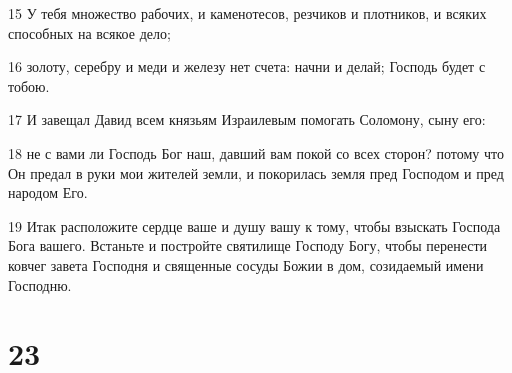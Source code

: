 \par 15 У тебя множество рабочих, и каменотесов, резчиков и плотников, и всяких способных на всякое дело;
\par 16 золоту, серебру и меди и железу нет счета: начни и делай; Господь будет с тобою.
\par 17 И завещал Давид всем князьям Израилевым помогать Соломону, сыну его:
\par 18 не с вами ли Господь Бог наш, давший вам покой со всех сторон? потому что Он предал в руки мои жителей земли, и покорилась земля пред Господом и пред народом Его.
\par 19 Итак расположите сердце ваше и душу вашу к тому, чтобы взыскать Господа Бога вашего. Встаньте и постройте святилище Господу Богу, чтобы перенести ковчег завета Господня и священные сосуды Божии в дом, созидаемый имени Господню.

\chapter{23}

